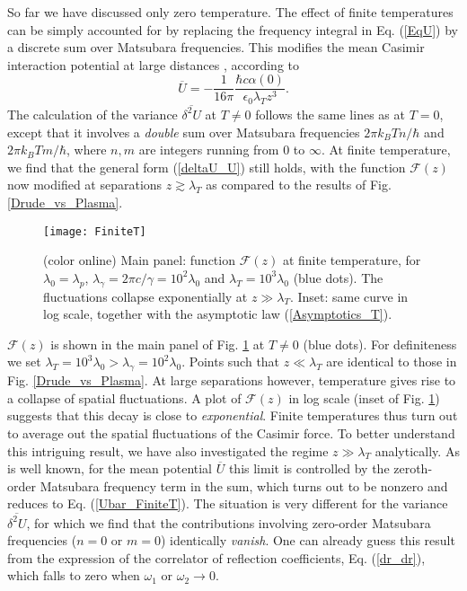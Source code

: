 \documentclass[doublecol]{epl2}
\begin{document}
So far we have discussed only zero temperature. The effect of finite temperatures can be simply accounted for by  replacing the frequency integral in Eq. (\ref{EqU}) by a discrete sum over Matsubara frequencies. This modifies the mean Casimir interaction potential at large distances%
, according to \cite{Ellingsen09}
\begin{equation}
\overline{U}=-\frac{1}{16\pi}\frac{\hbar c \alpha(0)}{\epsilon_0\lambda_T z^3}.
\label{Ubar_FiniteT}
\end{equation}
The calculation of the variance $\overline{\delta^2U}$ at $T\ne 0$ follows the same lines as at $T=0$, except that it involves a \textit{double} sum over Matsubara frequencies $2\pi k_BT n/\hbar $ and $2\pi k_BT m/\hbar $, where $n,m$ are integers running from 0 to $\infty$. At finite temperature, we find that the general form (\ref{deltaU_U}) still holds, with the function $\mathcal{F}(z)$ now modified at separations $z\gtrsim\lambda_T$ as compared to the results of Fig. \ref{Drude_vs_Plasma}.
\begin{figure}[h]
\texttt{[image: FiniteT]}
\caption{
\label{RFluctuations_T}
(color online) Main panel: function $\mathcal{F}(z)$ at finite temperature, for $\lambda_0=\lambda_p$, $\lambda_\gamma=2\pi c/\gamma=10^2\lambda_0$ and  $\lambda_T=10^3\lambda_0$ (blue dots).
The fluctuations collapse exponentially at $z\gg\lambda_T$. Inset:
same curve in log scale, together with the asymptotic law (\ref{Asymptotics_T}).}
\end{figure}
$\mathcal{F}(z)$ is shown in the main panel of Fig. \ref{RFluctuations_T} at $T\ne0$ (blue dots). For definiteness we set  $\lambda_T=10^3\lambda_0>\lambda_\gamma=10^2\lambda_0$. Points such that $z\ll\lambda_T$ are identical to those in Fig. \ref{Drude_vs_Plasma}. At large separations however, temperature gives rise to a collapse of spatial fluctuations. A plot of $\mathcal{F}(z)$ in log scale (inset of Fig. \ref{RFluctuations_T}) suggests that this decay is close to \textit{exponential}.
Finite temperatures thus turn out to average out the spatial fluctuations of the Casimir force. To better understand this intriguing result, we have also investigated the regime $z\gg\lambda_T$ analytically. As is well known, for the mean potential $\overline{U}$ this limit is controlled by the zeroth-order Matsubara frequency term in the sum, which turns out to be nonzero and reduces to Eq. (\ref{Ubar_FiniteT}). The situation is very different for the variance $\overline{\delta^2 U}$, for which we find that the contributions involving zero-order  Matsubara frequencies ($n=0$ or $m=0$) identically \textit{vanish}. One can already guess this result from the expression of the correlator of reflection coefficients, Eq. (\ref{dr_dr}), which falls to zero when $\omega_1$ or $\omega_2\to 0$. 
\end{document}
